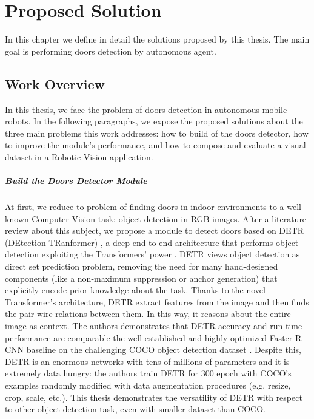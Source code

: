 \chapter{Proposed Solution}

In this chapter we define in detail the solutions proposed by this thesis. The main goal is performing doors detection by autonomous agent.

\section{Work Overview}

In this thesis, we face the problem of doors detection in autonomous mobile robots. In the following paragraphs, we expose the proposed solutions about the three main problems this work addresses: how to build of the doors detector, how to improve the module's performance, and how to compose and evaluate a visual dataset in a Robotic Vision application.

\paragraph{Build the Doors Detector Module} At first, we reduce to problem of finding doors in indoor environments to a well-known Computer Vision task: object detection in RGB images. After a literature review about this subject, we propose a module to detect doors based on DETR (DEtection TRanformer) \cite{detr}, a deep end-to-end architecture that performs object detection exploiting the Transformers' power \cite{transformer}. DETR views object detection as direct set prediction problem, removing the need for many hand-designed components (like a non-maximum suppression or anchor generation) that explicitly encode prior knowledge about the task. Thanks to the novel Transformer's architecture, DETR extract features from the image and then finds the pair-wire relations between them. In this way, it reasons about the entire image as context. The authors demonstrates that DETR accuracy and run-time performance are comparable the well-established and highly-optimized Faster R-CNN baseline \cite{fasterrcnn} on the challenging COCO object detection dataset \cite{coco}. Despite this, DETR is an enormous networks with tens of millions of parameters and it is extremely data hungry: the authors train DETR for 300 epoch with COCO's examples randomly modified with data augmentation procedures (e.g. resize, crop, scale, etc.). This thesis demonstrates the versatility of DETR with respect to other object detection task, even with smaller dataset than COCO.

